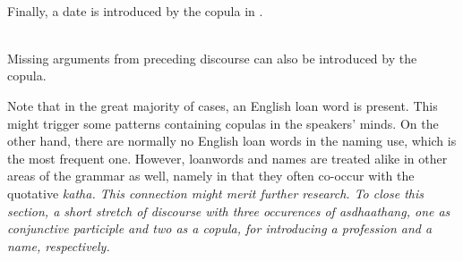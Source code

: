  \\
Finally, a date is introduced by the copula in .


 \\
Missing arguments from preceding discourse can also be introduced by the copula.






Note that in the great majority of cases, an English loan word is present. This might trigger some patterns containing copulas in the speakers' minds. On the other hand, there are normally no English loan words in the naming use, which is the most frequent one. However, loanwords and names are treated alike in other areas of the grammar as well, namely in that they often co-occur with the quotative \em katha\em {}. This connection might merit further research.
To close this section, a short stretch of discourse with three occurences of \em asdhaathang\em, one as conjunctive participle and two as a copula, for introducing a profession and a name, respectively.




